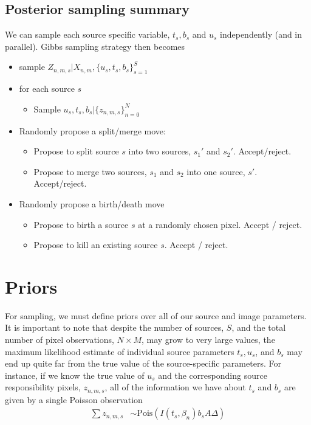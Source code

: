 \documentclass[11pt]{article}
\begin{document}
\subsection{Posterior sampling summary}

We can sample each source specific variable, $t_s, b_s$ and $u_s$ independently (and in parallel).  Gibbs sampling strategy then becomes
\begin{itemize}
\item sample $Z_{n,m,s} | X_{n,m}, \{u_s, t_s, b_s\}_{s=1}^S$
\item for each source $s$
  \begin{itemize}
  \item Sample $u_s, t_s, b_s | \{z_{n,m,s}\}_{n=0}^N$
  \end{itemize}
\item Randomly propose a split/merge move: 
  \begin{itemize}
  \item Propose to split source $s$ into two sources, $s_1'$ and $s_2'$.  Accept/reject.
  \item Propose to merge two sources, $s_1$ and $s_2$ into one source, $s'$.  Accept/reject. 
  \end{itemize}
  
\item Randomly propose a birth/death move
  \begin{itemize}
  \item  Propose to birth a source $s$ at a randomly chosen pixel. Accept / reject.
  \item Propose to kill an existing source $s$. Accept / reject.
  \end{itemize}
\end{itemize}



\section{Priors}
For sampling, we must define priors over all of our source and image parameters.  It is important to note that despite the number of sources, $S$, and the total number of pixel observations, $N \times M$, may grow to very large values, the maximum likelihood estimate of individual source parameters $t_s, u_s$, and $b_s$ may end up quite far from the true value of the source-specific parameters.  For instance, if we know the true value of $u_s$ and the corresponding source responsibility pixels, $z_{n,m,s}$, all of the information we have about $t_s$ and $b_s$ are given by a single Poisson observation 
\begin{align}
  \sum z_{n,m,s} &\sim \textrm{Pois}\left( I(t_s, \beta_n) b_s A \Delta \right) 
\end{align}
\end{document}

